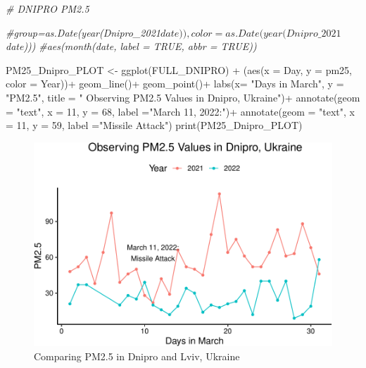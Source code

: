 \documentclass[
  12pt,
]{article}
\newenvironment{Shaded}{\begin{snugshade}}{\end{snugshade}}
\newcommand{\AttributeTok}[1]{\textcolor[rgb]{0.77,0.63,0.00}{#1}}
\newcommand{\CommentTok}[1]{\textcolor[rgb]{0.56,0.35,0.01}{\textit{#1}}}
\newcommand{\DecValTok}[1]{\textcolor[rgb]{0.00,0.00,0.81}{#1}}
\newcommand{\FunctionTok}[1]{\textcolor[rgb]{0.00,0.00,0.00}{#1}}
\newcommand{\NormalTok}[1]{#1}
\newcommand{\OtherTok}[1]{\textcolor[rgb]{0.56,0.35,0.01}{#1}}
\newcommand{\SpecialCharTok}[1]{\textcolor[rgb]{0.00,0.00,0.00}{#1}}
\newcommand{\StringTok}[1]{\textcolor[rgb]{0.31,0.60,0.02}{#1}}
\begin{document}
\begin{Shaded}
\begin{Highlighting}[]
\CommentTok{\# DNIPRO PM2.5}

\CommentTok{\#group=as.Date(year(Dnipro\_2021$date)), color =as.Date(year(Dnipro\_2021$date)))}
\CommentTok{\#aes(month(date, label = TRUE, abbr = TRUE)) }

\NormalTok{PM25\_Dnipro\_PLOT }\OtherTok{\textless{}{-}} 
  \FunctionTok{ggplot}\NormalTok{(FULL\_DNIPRO) }\SpecialCharTok{+} 
\NormalTok{  (}\FunctionTok{aes}\NormalTok{(}\AttributeTok{x =}\NormalTok{ Day, }\AttributeTok{y =}\NormalTok{ pm25, }\AttributeTok{color =}\NormalTok{ Year))}\SpecialCharTok{+} 
  \FunctionTok{geom\_line}\NormalTok{()}\SpecialCharTok{+}  
  \FunctionTok{geom\_point}\NormalTok{()}\SpecialCharTok{+}
  \FunctionTok{labs}\NormalTok{(}\AttributeTok{x=} \StringTok{"Days in March"}\NormalTok{, }\AttributeTok{y =} \StringTok{"PM2.5"}\NormalTok{,}
  \AttributeTok{title =} \StringTok{"          Observing PM2.5 Values in Dnipro, Ukraine"}\NormalTok{)}\SpecialCharTok{+} 
  \FunctionTok{annotate}\NormalTok{(}\AttributeTok{geom =} \StringTok{"text"}\NormalTok{, }\AttributeTok{x =} \DecValTok{11}\NormalTok{, }\AttributeTok{y =} \DecValTok{68}\NormalTok{, }\AttributeTok{label =}\StringTok{"March 11, 2022:"}\NormalTok{)}\SpecialCharTok{+} 
  \FunctionTok{annotate}\NormalTok{(}\AttributeTok{geom =} \StringTok{"text"}\NormalTok{, }\AttributeTok{x =} \DecValTok{11}\NormalTok{, }\AttributeTok{y =} \DecValTok{59}\NormalTok{, }\AttributeTok{label =}\StringTok{"Missile Attack"}\NormalTok{)}
\FunctionTok{print}\NormalTok{(PM25\_Dnipro\_PLOT)}
\end{Highlighting}
\end{Shaded}

\begin{figure}
\centering
\includegraphics{Fontanie_Gordon_Weinberg_Project_files/figure-latex/Plotting.PM25-1.pdf}
\caption{Comparing PM2.5 in Dnipro and Lviv, Ukraine}
\end{figure}
\end{document}
